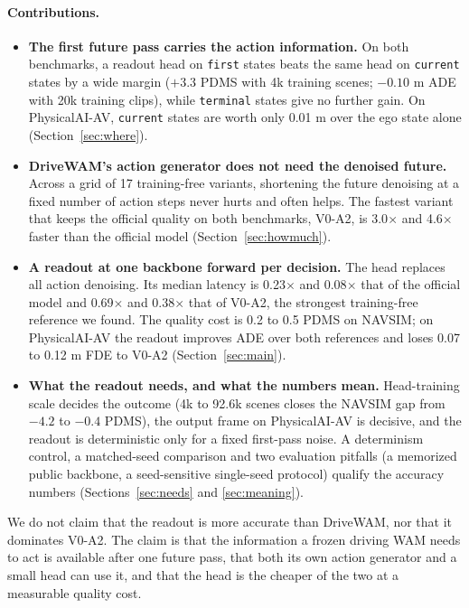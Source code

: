 \documentclass[10pt]{article}
\newcommand{\first}{\texttt{first}}
\newcommand{\current}{\texttt{current}}
\newcommand{\terminal}{\texttt{terminal}}
\newcommand{\VA}[2]{V#1-A#2}
\begin{document}
\paragraph{Contributions.}
\begin{itemize}
\item \textbf{The first future pass carries the action information.} On both benchmarks, a readout head on \first{} states beats the same head on \current{} states by a wide margin ($+3.3$ PDMS with 4k training scenes; $-0.10$ m ADE with 20k training clips), while \terminal{} states give no further gain. On PhysicalAI-AV, \current{} states are worth only 0.01 m over the ego state alone (Section~\ref{sec:where}).
\item \textbf{DriveWAM's action generator does not need the denoised future.} Across a grid of 17 training-free variants, shortening the future denoising at a fixed number of action steps never hurts and often helps. The fastest variant that keeps the official quality on both benchmarks, \VA{0}{2}, is 3.0$\times$ and 4.6$\times$ faster than the official model (Section~\ref{sec:howmuch}).
\item \textbf{A readout at one backbone forward per decision.} The head replaces all action denoising. Its median latency is 0.23$\times$ and 0.08$\times$ that of the official model and 0.69$\times$ and 0.38$\times$ that of \VA{0}{2}, the strongest training-free reference we found. The quality cost is 0.2 to 0.5 PDMS on NAVSIM; on PhysicalAI-AV the readout improves ADE over both references and loses 0.07 to 0.12 m FDE to \VA{0}{2} (Section~\ref{sec:main}).
\item \textbf{What the readout needs, and what the numbers mean.} Head-training scale decides the outcome (4k to 92.6k scenes closes the NAVSIM gap from $-4.2$ to $-0.4$ PDMS), the output frame on PhysicalAI-AV is decisive, and the readout is deterministic only for a fixed first-pass noise. A determinism control, a matched-seed comparison and two evaluation pitfalls (a memorized public backbone, a seed-sensitive single-seed protocol) qualify the accuracy numbers (Sections~\ref{sec:needs} and \ref{sec:meaning}).
\end{itemize}

We do not claim that the readout is more accurate than DriveWAM, nor that it dominates \VA{0}{2}. The claim is that the information a frozen driving WAM needs to act is available after one future pass, that both its own action generator and a small head can use it, and that the head is the cheaper of the two at a measurable quality cost.
\end{document}
